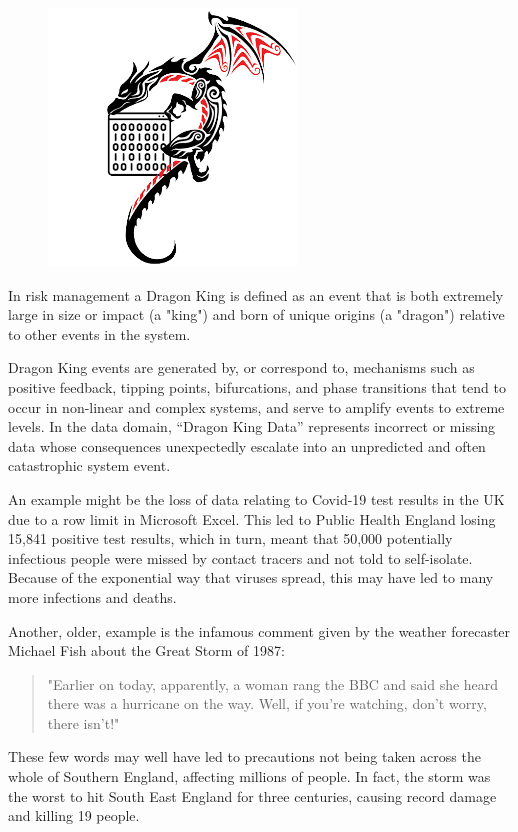 \begin{figure}
  \includegraphics{images/cygDragon}
\end{figure}

In risk management a Dragon King is defined as an event that is both extremely large in size
or impact (a "king") and born of unique origins (a "dragon") relative to other events in the system.

Dragon King events are generated by, or correspond to, mechanisms such as positive feedback,
tipping points, bifurcations, and phase transitions that tend to occur in non-linear and complex
systems, and serve to amplify events to extreme levels.
In the data domain, “Dragon King Data” represents incorrect or missing data whose consequences
unexpectedly escalate into an unpredicted and often catastrophic system event.

An example might be the loss of data relating to Covid-19 test results in the UK due to a row limit
in Microsoft Excel.
This led to Public Health England losing 15,841 positive test results, which in turn,
meant that 50,000 potentially infectious people were missed by contact tracers and not told to
self-isolate.
Because of the exponential way that viruses spread,
this may have led to many more infections and deaths.

Another, older, example is the infamous comment given by the weather forecaster Michael Fish
about the Great Storm of 1987:

\begin{quote}
"Earlier on today, apparently, a woman rang the BBC and said she heard there was a hurricane on the way. Well, if you're watching, don't worry, there isn't!"
\end{quote}

These few words may well have led to precautions not being taken across the whole of Southern
England, affecting millions of people.
In fact, the storm was the worst to hit South East England for three centuries,
causing record damage and killing 19 people.

